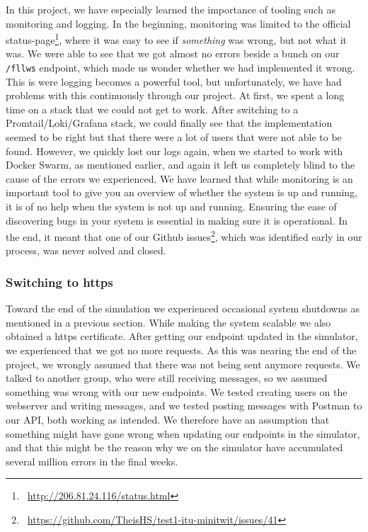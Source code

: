 In this project, we have especially learned the importance of tooling such as monitoring and logging. 
In the beginning, monitoring was limited to the official status-page\footnote{\ \url{http://206.81.24.116/status.html}}, where it was easy to see if \textit{something} was wrong, but not what it was. 
We were able to see that we got almost no errors beside a bunch on our \texttt{/fllws} endpoint, which made us wonder whether we had implemented it wrong.
This is were logging becomes a powerful tool, but unfortunately, we have had problems with this continuously through our project. 
At first, we spent a long time on a stack that we could not get to work. 
After switching to a Promtail/Loki/Grafana stack, we could finally see that the implementation seemed to be right but that there were a lot of users that were not able to be found. 
However, we quickly lost our logs again, when we started to work with Docker Swarm, as mentioned earlier, and again it left us completely blind to the cause of the errors we experienced. 
We have learned that while monitoring is an important tool to give you an overview of whether the system is up and running, it  is of no help when the system is not up and running. 
Ensuring the ease of discovering bugs in your system is essential in making sure it is operational. 
In the end, it meant that one of our Github issues\footnote{\ \url{https://github.com/TheisHS/test1-itu-minitwit/issues/41}}, which was identified early in our process, was never solved and closed.

\subsubsection*{Switching to https}
Toward the end of the simulation we experienced occasional system shutdowns as mentioned in a previous section. 
While making the system scalable we also obtained a https certificate. 
After getting our endpoint updated in the simulator, we experienced that we got no more requests. 
As this was nearing the end of the project, we wrongly assumed that there was not being sent anymore requests. 
We talked to another group, who were still receiving messages, so we assumed something was wrong with our new endpoints. 
We tested creating users on the webserver and writing messages, and we tested posting messages with Postman to our API, both working as intended.
We therefore have an assumption that something might have gone wrong when updating our endpoints in the simulator, and that this might be the reason why we on the simulator have accumulated several million errors in the final weeks.


